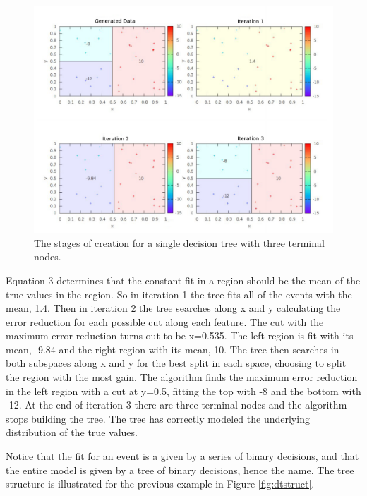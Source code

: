 \documentclass[12pt]{article}
\begin{document}
\begin{figure}[h!]
  \centering
  \includegraphics[width=6in]{imgs/BDT_featurespace_iteration.png}
  \caption
   {The stages of creation for a single decision tree with three terminal nodes.}
  \label{fig:dtbuild}
\end{figure}

\newpage

Equation 3 determines that the constant fit in a region should be the mean of the true values in the region. So in iteration 1 the tree fits all of the events with the mean, 1.4. Then in iteration 2 the tree searches along x and y calculating the error reduction for each possible cut along each feature. The cut with the maximum error reduction turns out to be x=0.535. The left region is fit with its mean, -9.84 and the right region with its mean, 10. The tree then searches in both subspaces along x and y for the best split in each space, choosing to split the region with the most gain. The algorithm finds the maximum error reduction in the left region with a cut at y=0.5, fitting the top with -8 and the bottom with -12. At the end of iteration 3 there are three terminal nodes and the algorithm stops building the tree. The tree has correctly modeled the underlying distribution of the true values. 

Notice that the fit for an event is a given by a series of binary decisions, and that the entire model is given by a tree of binary decisions, hence the name. The tree structure is illustrated for the previous example in Figure \ref{fig:dtstruct}.
\end{document}

